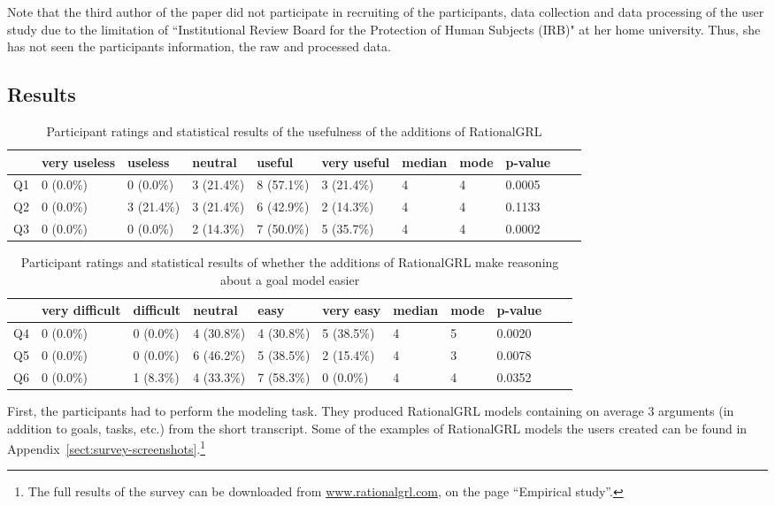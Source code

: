 Note that the third author of the paper did not participate in recruiting of the participants, data collection and data processing of the user study due to the limitation of ``Institutional Review Board for the Protection of Human Subjects (IRB)" at her home university. Thus, she has not seen the participants information, the raw and processed data.

\subsection{Results}\label{sec:survey:results}

\begin{table*}[t]
\centering
\begin{tabularx}{0.95\textwidth}{l|l|l|l|l|l||l|l|l|l|l}
& very useless & useless & neutral & useful & very useful & median & mode & p-value \\
\hline
Q1 & 0 (0.0\%) & 0 (0.0\%)  & 3 (21.4\%) & 8 (57.1\%) & 3 (21.4\%) & 4 & 4 & 0.0005 \\
Q2 & 0 (0.0\%) & 3 (21.4\%) & 3 (21.4\%) & 6 (42.9\%) & 2 (14.3\%) & 4 & 4 & 0.1133 \\
Q3 & 0 (0.0\%) & 0 (0.0\%)  & 2 (14.3\%) & 7 (50.0\%) & 5 (35.7\%) & 4 & 4 & 0.0002 
\end{tabularx}
\caption{Participant ratings and statistical results of the usefulness of the additions of RationalGRL}
\label{table:survey:table2}
\end{table*}

\begin{table*}[t]
\centering
\begin{tabularx}{0.95\textwidth}{l|l|l|l|l|l||l|l|l|l|l}
& very difficult & difficult & neutral & easy & very easy & median & mode & p-value \\
\hline
Q4  & 0 (0.0\%) & 0 (0.0\%) & 4 (30.8\%) & 4 (30.8\%) & 5 (38.5\%) & 4 & 5 & 0.0020 \\
Q5  & 0 (0.0\%) & 0 (0.0\%) & 6 (46.2\%) & 5 (38.5\%) & 2 (15.4\%) & 4 & 3 & 0.0078\\
Q6 & 0 (0.0\%) & 1 (8.3\%) & 4 (33.3\%) & 7 (58.3\%) & 0 (0.0\%)  & 4 & 4 & 0.0352
\end{tabularx}
\caption{Participant ratings and statistical results of whether the additions of RationalGRL make reasoning about a goal model easier}
\label{table:survey:table3}
\end{table*}

First, the participants had to perform the modeling task. They produced RationalGRL models containing on average 3 arguments (in addition  to goals, tasks, etc.) from the short transcript. Some of the examples of RationalGRL models the users created can be found in Appendix~\ref{sect:survey-screenshots}.\footnote{The full results of the survey can be downloaded from \url{www.rationalgrl.com}, on the page ``Empirical study''.}

